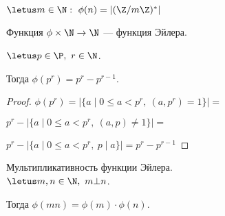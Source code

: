 \begin{defn}
    $\letus m \in \N:\ \phi(n) = |(\Z/m\Z)^*|$

    Функция $\phi \times \N \to \N$ --- функция Эйлера.
\end{defn}

\begin{theorem-non}
    $\letus p \in \P,~r \in \N$.

    Тогда $\phi(p^r) = p^r - p^{r-1}$.
\end{theorem-non}

\begin{proof}
    $\phi(p^r) = |\{a \mid 0 \leq a < p^r,~(a, p^r) = 1\}| = $

    $p^r -  |\{a \mid 0 \leq a < p^r,~(a, p) \neq 1\}| = $
    
    $p^r - |\{a \mid 0 \leq a < p^r,~p \mid a\}| = p^r - p^{r-1}$
\end{proof}

\begin{theorem-non} Мультипликативность функции Эйлера. \\
    $\letus m, n \in \N,~ m \bot n$.

    Тогда $\phi(mn) = \phi(m) \cdot \phi(n)$.
\end{theorem-non}

